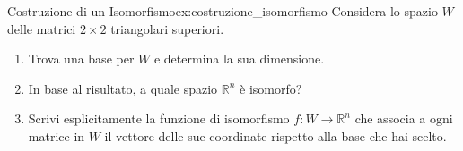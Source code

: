 \documentclass{article}
\begin{document}
\begin{exercise}{Costruzione di un Isomorfismo}{ex:costruzione_isomorfismo}
    Considera lo spazio $W$ delle matrici $2 \times 2$ triangolari superiori.
    \begin{enumerate}
        \item Trova una base per $W$ e determina la sua dimensione.
        \item In base al risultato, a quale spazio $\mathbb{R}^n$ è isomorfo?
        \item Scrivi esplicitamente la funzione di isomorfismo $f: W \to \mathbb{R}^n$ che associa a ogni matrice in $W$ il vettore delle sue coordinate rispetto alla base che hai scelto.
    \end{enumerate}
\end{exercise}
\end{document}
